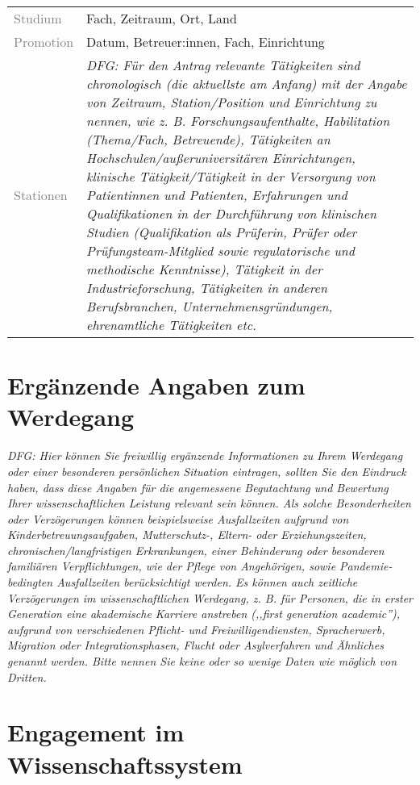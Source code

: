 \documentclass[a4paper,11pt]{article} %
\begin{document}
\noindent
\begin{tabularx}{\textwidth}{@{}lX}
\textcolor{gray}{Studium} & Fach, Zeitraum, Ort, Land \\
\textcolor{gray}{Promotion} & Datum, Betreuer:innen, Fach, Einrichtung\\
\textcolor{gray}{Stationen} & \emph{DFG: Für den Antrag relevante Tätigkeiten sind chronologisch (die aktuellste am Anfang) mit der Angabe von Zeitraum, Station/Position und Einrichtung zu nennen, wie z. B. Forschungsaufenthalte, Habilitation (Thema/Fach, Betreuende), Tätigkeiten an Hochschulen/außeruniversitären Einrichtungen, klinische Tätigkeit/Tätigkeit in der Versorgung von Patientinnen und Patienten, Erfahrungen und Qualifikationen in der Durchführung von klinischen Studien (Qualifikation als Prüferin, Prüfer oder Prüfungsteam-Mitglied sowie regulatorische und methodische Kenntnisse), Tätigkeit in der Industrieforschung, Tätigkeiten in anderen Berufsbranchen, Unternehmensgründungen, ehrenamtliche Tätigkeiten etc.}
\end{tabularx}

\section*{Ergänzende Angaben zum Werdegang}

\emph{DFG: Hier können Sie freiwillig ergänzende Informationen zu
Ihrem Werdegang oder einer besonderen persönlichen Situation
eintragen, sollten Sie den Eindruck haben, dass diese Angaben für
die angemessene Begutachtung und Bewertung Ihrer wissenschaftlichen
Leistung relevant sein können. Als solche Besonderheiten oder
Verzögerungen können beispielsweise Ausfallzeiten aufgrund von
Kinderbetreuungsaufgaben, Mutterschutz-, Eltern- oder
Erziehungszeiten, chronischen/langfristigen Erkrankungen, einer
Behinderung oder besonderen familiären Verpflichtungen, wie der
Pflege von Angehörigen, sowie Pandemie-bedingten Ausfallzeiten
berücksichtigt werden. Es können auch zeitliche Verzögerungen im
wissenschaftlichen Werdegang, z. B. für Personen, die in erster
Generation eine akademische Karriere anstreben (,,first generation
academic''), aufgrund von verschiedenen Pflicht- und
Freiwilligendiensten, Spracherwerb, Migration oder
Integrationsphasen, Flucht oder Asylverfahren und Ähnliches genannt
werden. Bitte nennen Sie keine oder so wenige Daten wie möglich von
Dritten. }

\section*{Engagement im Wissenschaftssystem}%
\end{document}
